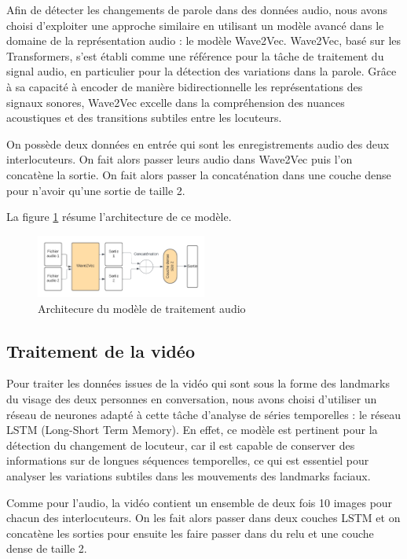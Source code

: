 \documentclass[a4paper]{article}
\begin{document}
Afin de détecter les changements de parole dans des données audio, nous avons choisi d'exploiter une approche similaire en utilisant un modèle avancé dans le domaine de la représentation audio : le modèle Wave2Vec. Wave2Vec, basé sur les Transformers, s'est établi comme une référence pour la tâche de traitement du signal audio, en particulier pour la détection des variations dans la parole. Grâce à sa capacité à encoder de manière bidirectionnelle les représentations des signaux sonores, Wave2Vec excelle dans la compréhension des nuances acoustiques et des transitions subtiles entre les locuteurs. 

On possède deux données en entrée qui sont les enregistrements audio des deux interlocuteurs. On fait alors passer leurs audio dans Wave2Vec puis l'on concatène la sortie. On fait alors passer la concaténation dans une couche dense pour n'avoir qu'une sortie de taille 2.

La figure \ref{fig: model_audio} résume l'architecture de ce modèle.

\begin{figure}[H]
    \centering
    \includegraphics[width=0.5\textwidth]{Traitement_audio_SAM.png}
    \caption{Architecure du modèle de traitement audio}
    \label{fig: model_audio}
\end{figure}

\subsection{Traitement de la vidéo}

Pour traiter les données issues de la vidéo qui sont sous la forme des landmarks du visage des deux personnes en conversation, nous avons choisi d'utiliser un réseau de neurones adapté à cette tâche d'analyse de séries temporelles : le réseau LSTM (Long-Short Term Memory). En effet, ce modèle est pertinent pour la détection du changement de locuteur, car il est capable de conserver des informations sur de longues séquences temporelles, ce qui est essentiel pour analyser les variations subtiles dans les mouvements des landmarks faciaux. 

Comme pour l'audio, la vidéo contient un ensemble de deux fois 10 images pour chacun des interlocuteurs. On les fait alors passer dans deux couches LSTM et on concatène les sorties pour ensuite les faire passer dans du relu et une couche dense de taille 2.
\end{document}
